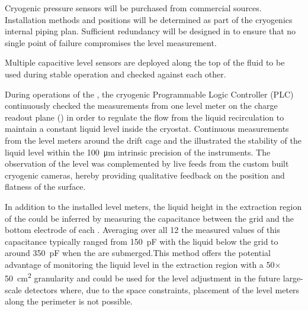 Cryogenic pressure sensors will be purchased from commercial sources.
Installation methods and positions will be determined as part of the
cryogenics internal piping plan.  Sufficient redundancy will be designed in
to ensure that no single point of failure compromises the level measurement.

Multiple capacitive level sensors are deployed along the top of
the fluid to be used during stable operation and checked against each
other.

During operations of the , the cryogenic Programmable Logic Controller (PLC) continuously checked the measurements from one level meter on the charge readout plane () in order to regulate the flow from the liquid recirculation to maintain a constant liquid level inside the cryostat. Continuous measurements from the level meters around the drift cage and the  illustrated the stability of the liquid level within the \SI{100}{\micro\meter} intrinsic precision of the instruments. The observation of the level was complemented by live feeds from the custom built cryogenic cameras, hereby providing qualitative feedback on the position and flatness of the surface.

In addition to the installed level meters, the liquid height in the extraction region of the  could be inferred by measuring the capacitance between the grid and the bottom electrode of each . Averaging over all \num{12}  the measured values of this capacitance typically ranged from \SI{150}{pF} with the liquid below the grid to around  \SI{350}{pF}  when the  are submerged.This method offers the potential advantage of monitoring the liquid level in the  extraction region with a \num{50}$\times$\SI{50}{\cm^2} granularity and could be used for the  level adjustment in the future large-scale detectors where, due to the space constraints, placement of the level meters along the  perimeter is not possible.

